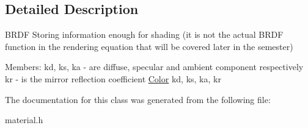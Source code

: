 \subsection{Detailed Description}
B\+R\+DF Storing information enough for shading (it is not the actual B\+R\+DF function in the rendering equation that will be covered later in the semester)

Members\+: kd, ks, ka -\/ are diffuse, specular and ambient component respectively kr -\/ is the mirror reflection coefficient \mbox{\hyperlink{class_color}{Color}} kd, ks, ka, kr 

The documentation for this class was generated from the following file\+:\begin{DoxyCompactItemize}
\item 
material.\+h\end{DoxyCompactItemize}

